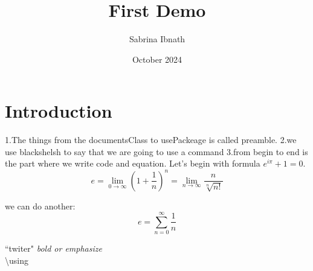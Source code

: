 \documentclass{article}
\title{First Demo}
\author{Sabrina Ibnath}
\date{October 2024}
\begin{document}
\maketitle

\section{Introduction}
1.The things from the documentsClass to usePackeage is called  preamble.
2.we use blackshelsh to say that we are going to use a command
3.from begin to end is the part where we write code and equation.
Let's begin with formula $e^{i\pi}+1=0$.
$$e=\lim_{0\to\infty}\left(1+\frac{1}{n}\right)^n=\lim_{n\to\infty}\frac{n}{\sqrt[n]{n!}}$$

we can do another:
$$e=\sum_{n=0}^{\infty}\frac{1}{n}$$

``twiter"
\emph{bold or emphasize}
{\color{blue}{important}}\\
\textbackslash{using}
\end{document}
